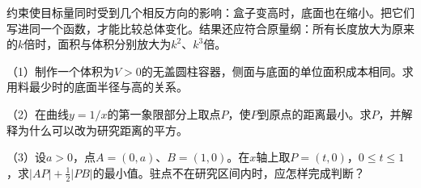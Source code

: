 约束使目标量同时受到几个相反方向的影响：盒子变高时，底面也在缩小。把它们写进同一个函数，才能比较总体变化。结果还应符合原量纲：所有长度放大为原来的\(k\)倍时，面积与体积分别放大为\(k^2\)、\(k^3\)倍。

\begin{exercise}
\mbox{}\par\nobreak

（1）制作一个体积为\(V>0\)的无盖圆柱容器，侧面与底面的单位面积成本相同。求用料最少时的底面半径与高的关系。

（2）在曲线\(y=1/x\)的第一象限部分上取点\(P\)，使\(P\)到原点的距离最小。求\(P\)，并解释为什么可以改为研究距离的平方。

（3）设\(a>0\)，点\(A=(0,a)\)、\(B=(1,0)\)。在\(x\)轴上取\(P=(t,0)\)，\(0\le t\le1\)，求\(|AP|+\tfrac12|PB|\)的最小值。驻点不在研究区间内时，应怎样完成判断？
\end{exercise}
\endgroup

